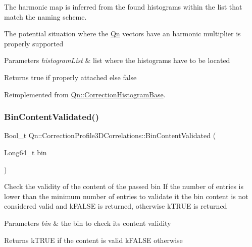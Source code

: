 The harmonic map is inferred from the found histograms within the list that match the naming scheme.

The potential situation where the \mbox{\hyperlink{namespaceQn}{Qn}} vectors have an harmonic multiplier is properly supported


\begin{DoxyParams}{Parameters}
{\em histogram\+List} & list where the histograms have to be located \\
\hline
\end{DoxyParams}
\begin{DoxyReturn}{Returns}
true if properly attached else false 
\end{DoxyReturn}


Reimplemented from \mbox{\hyperlink{classQn_1_1CorrectionHistogramBase_ad8bcd0079fe5db561780a522e46b7b16}{Qn\+::\+Correction\+Histogram\+Base}}.

\mbox{\label{classQn_1_1CorrectionProfile3DCorrelations_ad771201bd096e4e9bd028891baa032d9}} 
\subsubsection{\texorpdfstring{Bin\+Content\+Validated()}{BinContentValidated()}}
{\footnotesize\ttfamily Bool\+\_\+t Qn\+::\+Correction\+Profile3\+D\+Correlations\+::\+Bin\+Content\+Validated (\begin{DoxyParamCaption}\item[{Long64\+\_\+t}]{bin }\end{DoxyParamCaption})\hspace{0.3cm}{\ttfamily [virtual]}}

Check the validity of the content of the passed bin If the number of entries is lower than the minimum number of entries to validate it the bin content is not considered valid and k\+F\+A\+L\+SE is returned, otherwise k\+T\+R\+UE is returned 
\begin{DoxyParams}{Parameters}
{\em bin} & the bin to check its content validity \\
\hline
\end{DoxyParams}
\begin{DoxyReturn}{Returns}
k\+T\+R\+UE if the content is valid k\+F\+A\+L\+SE otherwise 
\end{DoxyReturn}


